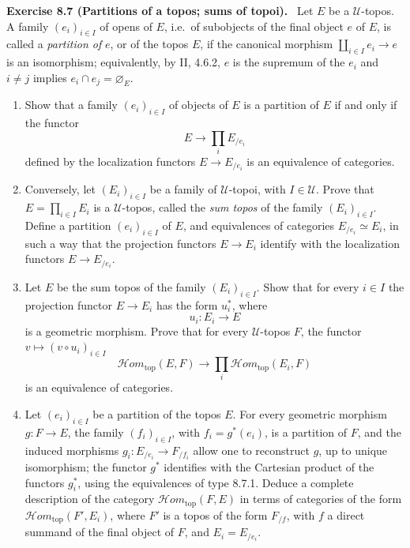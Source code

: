 \documentclass[11pt]{article}
\newcommand{\U}{\mathcal{U}}
\newcommand{\Hhomtop}{\mathcal{H}om_{\mathrm{top}}}
\newcommand{\ie}{i.e.}
\newenvironment{remarktext}[1]{\par\medskip\noindent\textbf{#1.}\ }{\par\medskip}
\begin{document}
\begin{remarktext}{Exercise 8.7 (Partitions of a topos; sums of topoi)}
Let \(E\) be a \(\U\)-topos. A family \((e_i)_{i\in I}\) of opens of \(E\), \ie\ of subobjects of the final object \(e\) of \(E\), is called a \emph{partition of} \(e\), or of the topos \(E\), if the canonical morphism \(\coprod_{i\in I}e_i\to e\) is an isomorphism; equivalently, by II, 4.6.2, \(e\) is the supremum of the \(e_i\) and \(i\ne j\) implies \(e_i\cap e_j=\varnothing_E\).
\begin{enumerate}[label=\alph*)]
\item Show that a family \((e_i)_{i\in I}\) of objects of \(E\) is a partition of \(E\) if and only if the functor
\begin{equation*}
E\longrightarrow\prod_i E_{/e_i}\tag{8.7.1}
\end{equation*}
defined by the localization functors \(E\to E_{/e_i}\) is an equivalence of categories.

\item Conversely, let \((E_i)_{i\in I}\) be a family of \(\U\)-topoi, with \(I\in\U\). Prove that \(E=\prod_{i\in I}E_i\) is a \(\U\)-topos, called the \emph{sum topos} of the family \((E_i)_{i\in I}\). Define a partition \((e_i)_{i\in I}\) of \(E\), and equivalences of categories \(E_{/e_i}\simeq E_i\), in such a way that the projection functors \(E\to E_i\) identify with the localization functors \(E\to E_{/e_i}\).

\item Let \(E\) be the sum topos of the family \((E_i)_{i\in I}\). Show that for every \(i\in I\) the projection functor \(E\to E_i\) has the form \(u_i^*\), where
\begin{equation*}
u_i:E_i\longrightarrow E\tag{8.7.2}
\end{equation*}
is a geometric morphism. Prove that for every \(\U\)-topos \(F\), the functor \(v\mapsto(v\circ u_i)_{i\in I}\)
\begin{equation*}
\Hhomtop(E,F)\longrightarrow\prod_i\Hhomtop(E_i,F)\tag{8.7.3}
\end{equation*}
is an equivalence of categories.

\item Let \((e_i)_{i\in I}\) be a partition of the topos \(E\). For every geometric morphism \(g:F\to E\), the family \((f_i)_{i\in I}\), with \(f_i=g^*(e_i)\), is a partition of \(F\), and the induced morphisms \(g_i:E_{/e_i}\to F_{/f_i}\) allow one to reconstruct \(g\), up to unique isomorphism; the functor \(g^*\) identifies with the Cartesian product of the functors \(g_i^*\), using the equivalences of type 8.7.1. Deduce a complete description of the category \(\Hhomtop(F,E)\) in terms of categories of the form \(\Hhomtop(F',E_i)\), where \(F'\) is a topos of the form \(F_{/f}\), with \(f\) a direct summand of the final object of \(F\), and \(E_i=E_{/e_i}\).


\end{enumerate}
\end{remarktext}
\end{document}
